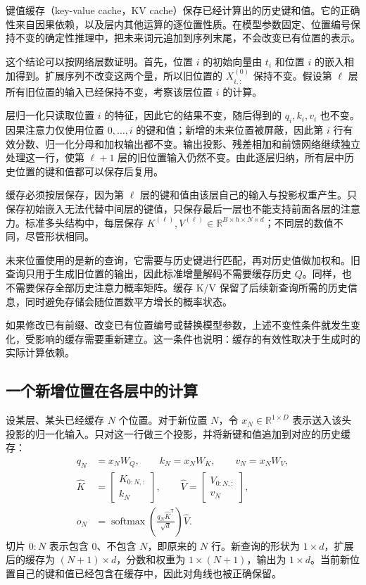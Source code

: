 键值缓存（key-value cache，KV cache）保存已经计算出的历史键和值。它的正确性来自因果依赖，以及层内其他运算的逐位置性质。在模型参数固定、位置编号保持不变的确定性推理中，把未来词元追加到序列末尾，不会改变已有位置的表示。

这个结论可以按网络层数证明。首先，位置 $i$ 的初始向量由 $t_i$ 和位置 $i$ 的嵌入相加得到。扩展序列不改变这两个量，所以旧位置的 $X^{(0)}_{i,:}$ 保持不变。假设第 $\ell$ 层所有旧位置的输入已经保持不变，考察该层位置 $i$ 的计算。

层归一化只读取位置 $i$ 的特征，因此它的结果不变，随后得到的 $q_i,k_i,v_i$ 也不变。因果注意力仅使用位置 $0,\ldots,i$ 的键和值；新增的未来位置被屏蔽，因此第 $i$ 行有效分数、归一化分母和加权输出都不变。输出投影、残差相加和前馈网络继续独立处理这一行，使第 $\ell+1$ 层的旧位置输入仍然不变。由此逐层归纳，所有层中历史位置的键和值都可以保存后复用。

缓存必须按层保存，因为第 $\ell$ 层的键和值由该层自己的输入与投影权重产生。只保存初始嵌入无法代替中间层的键值，只保存最后一层也不能支持前面各层的注意力。标准多头结构中，每层保存 $K^{(\ell)},V^{(\ell)}\in\mathbb{R}^{B\times h\times N\times d}$；不同层的数值不同，尽管形状相同。

未来位置使用的是新的查询，它需要与历史键进行匹配，再对历史值做加权和。旧查询只用于生成旧位置的输出，因此标准增量解码不需要缓存历史 $Q$。同样，也不需要保存全部历史注意力概率矩阵。缓存 K/V 保留了后续新查询所需的历史信息，同时避免存储会随位置数平方增长的概率状态。

如果修改已有前缀、改变已有位置编号或替换模型参数，上述不变性条件就发生变化，受影响的缓存需要重新建立。这一条件也说明：缓存的有效性取决于生成时的实际计算依赖。

\subsection{一个新增位置在各层中的计算}

设某层、某头已经缓存 $N$ 个位置。对于新位置 $N$，令 $x_N\in\mathbb{R}^{1\times D}$ 表示送入该头投影的归一化输入。只对这一行做三个投影，并将新键和值追加到对应的历史缓存：
\begin{equation}
\begin{aligned}
 q_N&=x_NW_Q,\qquad k_N=x_NW_K,\qquad v_N=x_NW_V,\\
 \widehat K&=\begin{bmatrix}K_{0:N,:}\\k_N\end{bmatrix},\qquad
 \widehat V=\begin{bmatrix}V_{0:N,:}\\v_N\end{bmatrix},\\
 o_N&=\operatorname{softmax}\!\left(\frac{q_N\widehat K^{\mathsf T}}{\sqrt d}\right)\widehat V.
\end{aligned}
\label{l12:eq:cached-attention}
\end{equation}
切片 $0:N$ 表示包含 $0$、不包含 $N$，即原来的 $N$ 行。新查询的形状为 $1\times d$，扩展后的缓存为 $(N+1)\times d$，分数和权重为 $1\times(N+1)$，输出为 $1\times d$。当前新位置自己的键和值已经包含在缓存中，因此对角线也被正确保留。

